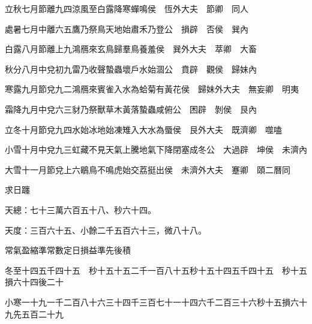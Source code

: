 \begin{pinyinscope}
 立秋七月節離九四涼風至白露降寒蟬鳴侯　恆外大夫　節卿　同人



 處暑七月中離六五鷹乃祭鳥天地始肅禾乃登公　損辟　否侯　巽內



 白露八月節離上九鴻鴈來玄鳥歸羣鳥養羞侯　巽外大夫　萃卿　大畜



 秋分八月中兌初九雷乃收聲蟄蟲壞戶水始涸公　賁辟　觀侯　歸妹內



 寒露九月節兌九二鴻鴈來賓雀入水為蛤菊有黃花侯　歸妹外大夫　無妄卿　明夷



 霜降九月中兌六三豺乃祭獸草木黃落蟄蟲咸俯公　困辟　剝侯　艮內



 立冬十月節兌九四水始冰地始凍雉入大水為蜃侯　艮外大夫　既濟卿　噬嗑



 小雪十月中兌九三虹藏不見天氣上騰地氣下降閉塞成冬公　大過辟　坤侯　未濟內



 大雪十一月節兌上六鶡鳥不鳴虎始交荔挺出侯　未濟外大夫　蹇卿　頤二曆同



 求日躔


天總：七十三萬六百五十八、秒六十四。


天度：三百六十五、小餘二千五百六十三，微八十八。



 常氣盈縮準常數定日損益準先後積



 冬至十四五千四十五　秒十五十五二千一百八十五秒十五十四五千四十五　秒十五損六十四後二十



 小寒一十九一千二百八十六三十四千三百七十一十四六千二百三十六秒十五損六十九先五百二十九




\end{pinyinscope}

